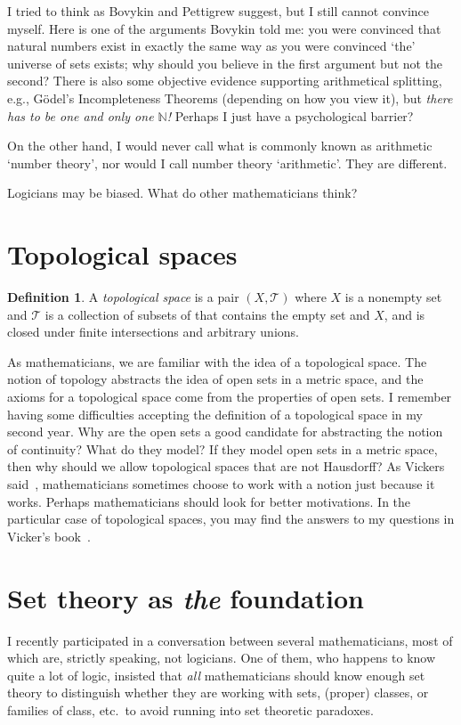 \documentclass{bhamthesis}
\theoremstyle{definition}
\newtheorem*{defn}{Definition}
\newcommand{\mar}[1]{\marginpar{\raggedright#1}}
\newcommand{\IN}{\mathbb{N}}
\begin{document}
I tried to think as Bovykin and Pettigrew suggest, but I still
cannot convince myself.  Here is one of the arguments Bovykin told
me: you were convinced that natural numbers exist in exactly the
same way as you were convinced `the' universe of sets exists; why
should you believe in the first argument but not the second? There
is also some objective evidence supporting arithmetical splitting,
e.g., G\"odel's Incompleteness Theorems (depending on how you view
it), but \emph{there has to be one and only one $\IN$!}  Perhaps I
just have a psychological barrier?

On the other hand, I would never call what is commonly known as
arithmetic `number theory', nor would I call number theory
`arithmetic'.  They are different.

Logicians may be biased.  What do other mathematicians think?

\section{Topological spaces}
\begin{defn}
 A \emph{topological space} is a pair $(X,\mathcal{T})$ where $X$
 is a nonempty set and $\mathcal{T}$ is a collection of subsets of
 that contains the empty set and $X$, and is closed under finite
 intersections and arbitrary unions.
\end{defn}
As mathematicians, we are familiar with the idea of a topological
space.  The notion of topology abstracts the idea of open sets in
a metric space, and the axioms for a topological space come from
the properties of open sets.  I remember having some difficulties
accepting the definition of a topological space in my second year.
Why are the open sets a good candidate for abstracting the notion
of continuity?  What do they model?  If they model open sets in a
metric space, then why should we allow topological spaces that are
not Hausdorff?  As Vickers said~\cite{unpub:vickers/dptsem},
mathematicians sometimes choose to work with a notion just because
it works.  Perhaps mathematicians should look for better
motivations.  In the particular case of topological spaces, you
may find the answers to my questions in Vicker's
book~\cite{book:topologic}.\mar{This is another awkward looking
widow.}

\section{Set theory as \emph{the} foundation}
I recently participated in a conversation between several
mathematicians, most of which are, strictly speaking, not
logicians.  One of them, who happens to know quite a lot of logic,
insisted that \emph{all} mathematicians should know enough set
theory to distinguish whether they are working with sets, (proper)
classes, or families of class, etc.\ to avoid running into set
theoretic paradoxes.
\end{document}
